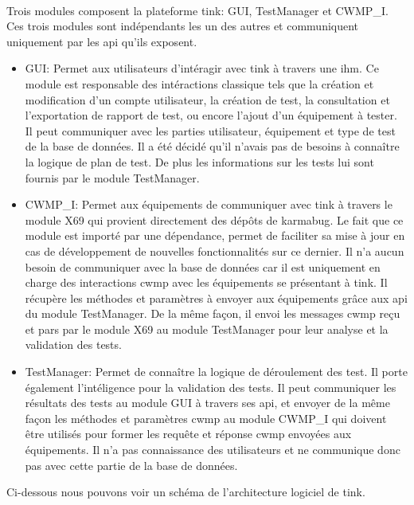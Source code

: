 \documentclass[12pt,a4paper]{report}
\begin{document}
\paragraph*{}Trois modules composent la plateforme \gls{tink}: GUI, TestManager et CWMP\_I. Ces trois modules sont indépendants les un des autres et communiquent uniquement par les \gls{api} qu'ils exposent. 
\begin{itemize}
\item GUI: Permet aux utilisateurs d'intéragir avec \gls{tink} à travers une \gls{ihm}. Ce module est responsable des intéractions classique tels que la création et modification d'un compte utilisateur, la création de test, la consultation et l'exportation de rapport de test, ou encore l'ajout d'un équipement à tester. Il peut communiquer avec les parties utilisateur, équipement et type de test de la base de données. Il a été décidé qu'il n'avais pas de besoins à connaître la logique de plan de test. De plus les informations sur les tests lui sont fournis par le module TestManager. 
\item CWMP\_I: Permet aux équipements de communiquer avec \gls{tink} à travers le module X69 qui provient directement des dépôts de \gls{karmabug}. Le fait que ce module est importé par une dépendance, permet de faciliter sa mise à jour en cas de développement de nouvelles fonctionnalités sur ce dernier. Il n'a aucun besoin de communiquer avec la base de données car il est uniquement en charge des interactions \gls{cwmp} avec les équipements se présentant à \gls{tink}. Il récupère les méthodes et paramètres à envoyer aux équipements grâce aux \gls{api} du module TestManager. De la même façon, il envoi les messages \gls{cwmp} reçu et pars par le module X69 au module TestManager pour leur analyse et la validation des tests. 
\item TestManager: Permet de connaître la logique de déroulement des test. Il porte également l'intéligence pour la validation des tests. Il peut communiquer les résultats des tests au module GUI à travers ses \gls{api}, et envoyer de la même façon les méthodes et paramètres \gls{cwmp} au module CWMP\_I qui doivent être utilisés pour former les requête et réponse \gls{cwmp} envoyées aux équipements. Il n'a pas connaissance des utilisateurs et ne communique donc pas avec cette partie de la base de données.
\end{itemize}
Ci-dessous nous pouvons voir un schéma de l'architecture logiciel de \gls{tink}. 
\end{document}
